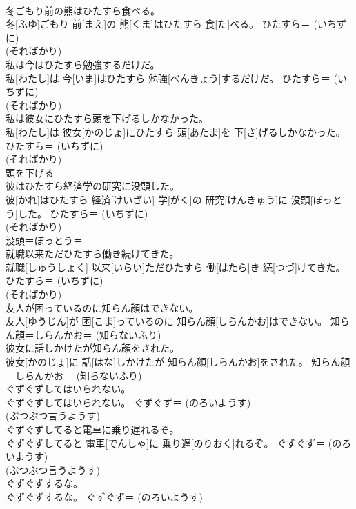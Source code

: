 \documentclass[8pt]{extreport}
\begin{document}
\begin{CJK}{UTF8}{min}
{\\	冬ごもり前の熊はひたすら食べる。	
\\	冬[ふゆ]ごもり 前[まえ]の 熊[くま]はひたすら 食[た]べる。	ひたすら＝ (いちずに) 
\\	(そればかり) 
\\	私は今はひたすら勉強するだけだ。	
\\	私[わたし]は 今[いま]はひたすら 勉強[べんきょう]するだけだ。	ひたすら＝ (いちずに) 
\\	(そればかり) 
\\	私は彼女にひたすら頭を下げるしかなかった。	
\\	私[わたし]は 彼女[かのじょ]にひたすら 頭[あたま]を 下[さ]げるしかなかった。	ひたすら＝ (いちずに) 
\\	(そればかり) 
\\	頭を下げる＝ 
\\	彼はひたすら経済学の研究に没頭した。	
\\	彼[かれ]はひたすら 経済[けいざい] 学[がく]の 研究[けんきゅう]に 没頭[ぼっとう]した。	ひたすら＝ (いちずに) 
\\	(そればかり) 
\\	没頭＝ぼっとう＝ 
\\	就職以来ただひたすら働き続けてきた。	
\\	就職[しゅうしょく] 以来[いらい]ただひたすら 働[はたら]き 続[つづ]けてきた。	ひたすら＝ (いちずに) 
\\	(そればかり) 
\\	友人が困っているのに知らん顔はできない。	
\\	友人[ゆうじん]が 困[こま]っているのに 知らん顔[しらんかお]はできない。	知らん顔＝しらんかお＝ (知らないふり) 
\\	彼女に話しかけたが知らん顔をされた。	
\\	彼女[かのじょ]に 話[はな]しかけたが 知らん顔[しらんかお]をされた。	知らん顔＝しらんかお＝ (知らないふり) 
\\	ぐずぐずしてはいられない。	
\\	ぐずぐずしてはいられない。	ぐずぐず＝ (のろいようす) 
\\	(ぶつぶつ言うようす)
\\	ぐずぐずしてると電車に乗り遅れるぞ。	
\\	ぐずぐずしてると 電車[でんしゃ]に 乗り遅[のりおく]れるぞ。	ぐずぐず＝ (のろいようす) 
\\	(ぶつぶつ言うようす)
\\	ぐずぐずするな。	
\\	ぐずぐずするな。	ぐずぐず＝ (のろいようす) 
}
\end{CJK}
\end{document}
